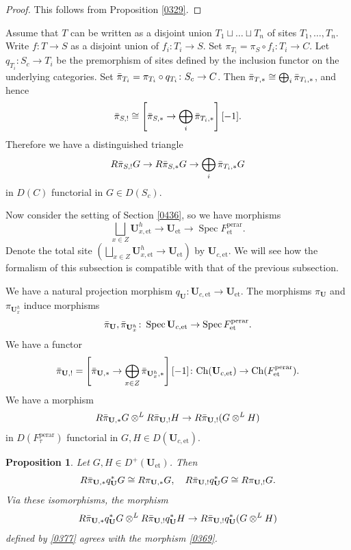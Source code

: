 \documentclass{amsart}
\newtheorem{Prop}[Thm]{Proposition}
\theoremstyle{remark}
\numberwithin{equation}{subsection}
\newcommand{\compose}{\mathbin{\circ}}
\newcommand{\tensor}{\mathbin{\otimes}}
\newcommand{\et}{\mathrm{et}}
\newcommand{\perar}{\mathrm{perar}}
\newcommand{\alg}[1]{\mathbf{#1}}
\newcommand{\Ch}{\mathrm{Ch}}
\DeclareMathOperator{\Spec}{Spec}
\begin{document}
\begin{proof}
	This follows from Proposition \ref{0329}.
\end{proof}

Assume that $T$ can be written as a disjoint union
$T_{1} \sqcup \dots \sqcup T_{n}$ of sites $T_{1}, \dots, T_{n}$.
Write $f \colon T \to S$ as a disjoint union of $f_{i} \colon T_{i} \to S$.
Set $\pi_{T_{i}} = \pi_{S} \compose f_{i} \colon T_{i} \to C$.
Let $q_{T_{i}} \colon S_{c} \to T_{i}$ be the premorphism of sites
defined by the inclusion functor on the underlying categories.
Set $\Bar{\pi}_{T_{i}} = \pi_{T_{i}} \compose q_{T_{i}} \colon S_{c} \to C$.
Then $\Bar{\pi}_{T, \ast} \cong \bigoplus_{i} \Bar{\pi}_{T_{i}, \ast}$, and hence
	\[
			\Bar{\pi}_{S, !}
		\cong
			\left[
				\Bar{\pi}_{S, \ast} \to \bigoplus_{i} \Bar{\pi}_{T_{i}, \ast}
			\right][-1].
	\]
Therefore we have a distinguished triangle
	\[
			R \Bar{\pi}_{S, !} G
		\to
			R \Bar{\pi}_{S, \ast} G
		\to
			\bigoplus_{i} \Bar{\pi}_{T_{i}, \ast} G
	\]
in $D(C)$ functorial in $G \in D(S_{c})$.

Now consider the setting of Section \ref{0436},
so we have morphisms
	\[
			\bigsqcup_{x \in Z}
				\alg{U}_{x, \et}^{h}
		\to
			\alg{U}_{\et}
		\to
			\Spec F^{\perar}_{\et}.
	\]
Denote the total site
$(\bigsqcup_{x \in Z} \alg{U}_{x, \et}^{h} \to \alg{U}_{\et})$
by $\alg{U}_{c, \et}$.
We will see how the formalism of this subsection is compatible with
that of the previous subsection.

We have a natural projection morphism $q_{\alg{U}} \colon \alg{U}_{c, \et} \to \alg{U}_{\et}$.
The morphisms $\pi_{\alg{U}}$ and $\pi_{\alg{U}_{x}^{h}}$ induce morphisms
	\[
			\Bar{\pi}_{\alg{U}},
			\Bar{\pi}_{\alg{U}_{x}^{h}}
		\colon
			\Spec \alg{U}_{c, \et}
		\to
			\Spec F^{\perar}_{\et}.
	\]
We have a functor
	\[
			\Bar{\pi}_{\alg{U}, !}
		=
			\left[
					\Bar{\pi}_{\alg{U}, \ast}
				\to
					\bigoplus_{x \in Z}
						\Bar{\pi}_{\alg{U}_{x}^{h}, \ast}
			\right][-1]
		\colon
			\Ch(\alg{U}_{c, \et})
		\to
			\Ch(F^{\perar}_{\et}).
	\]
We have a morphism
	\begin{equation} \label{0377}
				R \Bar{\pi}_{\alg{U}, \ast} G
			\tensor^{L}
				R \Bar{\pi}_{\alg{U}, !} H
		\to
			R \Bar{\pi}_{\alg{U}, !}(G \tensor^{L} H)
	\end{equation}
in $D(F^{\perar}_{\tau})$ functorial in $G, H \in D(\alg{U}_{c, \et})$.

\begin{Prop} \label{0397}
	Let $G, H \in D^{+}(\alg{U}_{\et})$.
	Then
		\[
					R \Bar{\pi}_{\alg{U}, \ast} q_{\alg{U}}^{\ast} G
				\cong
					R \pi_{\alg{U}, \ast} G,
			\quad
					R \Bar{\pi}_{\alg{U}, !} q_{\alg{U}}^{\ast} G
				\cong
					R \pi_{\alg{U}, !} G.
		\]
	Via these isomorphisms, the morphism
		\[
					R \Bar{\pi}_{\alg{U}, \ast} q_{\alg{U}}^{\ast} G
				\tensor^{L}
					R \Bar{\pi}_{\alg{U}, !} q_{\alg{U}}^{\ast} H
			\to
				R \Bar{\pi}_{\alg{U}, !} q_{\alg{U}}^{\ast}(G \tensor^{L} H)
		\]
	defined by \eqref{0377} agrees with the morphism \eqref{0369}.
\end{Prop}
\end{document}
